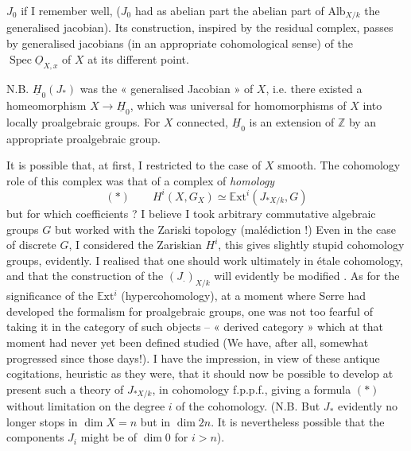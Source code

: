 \documentclass[11pt,a4paper]{article}
\begin{document}
$J_0$ if I remember well, ($J_0$ had as abelian part the abelian part of $\mathrm{Alb}_{X/k}$ the   generalised jacobian). Its construction, inspired by the residual complex, passes by generalised jacobians (in an appropriate cohomological sense) of the   $\operatorname{Spec} \underline{O}_{X,x}$ of $X$ at its different point.

N.B. $\underline{H}_0(J_*)$ was the « generalised Jacobian » of $X$, i.e. there existed a homeomorphism $X \to \underline{H}_0$, which was universal for homomorphisms of $X$ into  locally proalgebraic groups. For $X$ connected, $\underline{H}_0$ is an extension of $\mathbb{Z}$ by an appropriate proalgebraic group.

It is possible that, at first, I restricted to the case of $X$ smooth. The cohomology role of this complex was that of a complex of \emph{homology}
\[
(*) \qquad H^i(X, G_X) \simeq \mathbb{E}\mathrm{xt}^i(J_{*X/k}, G)
\]
but for which coefficients ? I believe I took arbitrary commutative algebraic groups $G$ but worked with the Zariski topology (malédiction !) Even in the case of discrete $G$, I considered the Zariskian $H^i$, this gives slightly stupid cohomology groups, evidently. I realised that one should work ultimately in étale cohomology, and that the construction of the $(J_{\cdot})_{X/k}$ will evidently be modified . As for the significance of the $\mathbb{E}\mathrm{xt}^i$ (hypercohomology), at a moment where Serre had developed the formalism for proalgebraic groups, one was not too fearful of taking it in the category of such objects --   « derived category » which at that moment had never yet been  defined   studied (We have, after all, somewhat progressed since those days!). I have the impression, in view of these antique cogitations, heuristic as they were, that it should now be possible to develop at present such a theory of $J_{*X/k}$, in cohomology f.p.p.f., giving a formula $(*)$ without limitation on the degree $i$ of the cohomology. (N.B. But $J_*$ evidently no longer stops in $\dim X = n$ but in $\dim 2n$. It is nevertheless possible that the components $J_i$ might be of $\dim 0$ for $i > n$).
\end{document}
